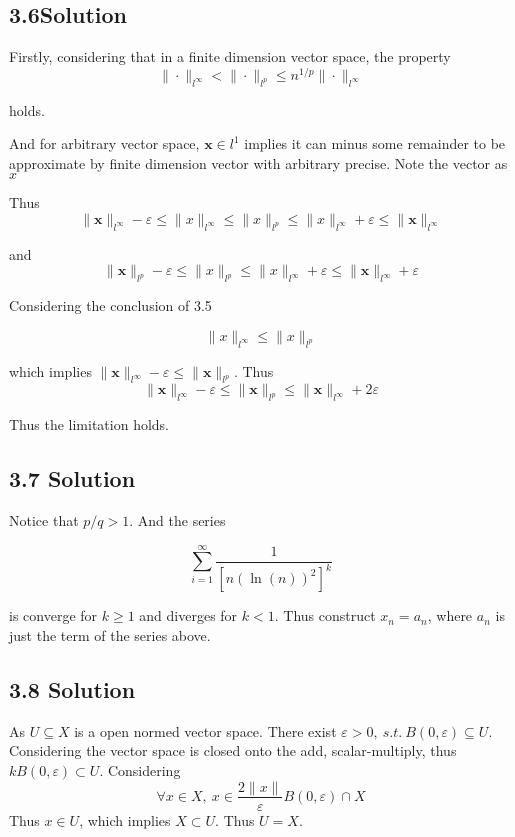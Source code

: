 \documentclass{article}
\begin{document}
\subsection*{3.6Solution}
Firstly, considering that in a finite dimension vector space, the property
\[\|\cdot\|_{l^\infty} < \|\cdot\|_{l^p} \le n^{1/p}\|\cdot\|_{l^\infty}\]

holds.

And for arbitrary vector space, \(\mathbf{x} \in {l}^1\) implies it can minus some remainder to be approximate by finite dimension vector with arbitrary precise. Note the vector as \(x\)

Thus
\[\|\mathbf{x}\|_{l^\infty} - \varepsilon \le \|x\|_{l^\infty} \le \|x\|_{l^p} \le \|x\|_{l^\infty} + \varepsilon \le \|\mathbf x\|_{l^\infty} \]

and 
\[\|\mathbf{x}\|_{l^p} - \varepsilon \le \|x\|_{l^p} \le \|x\|_{l^\infty} + \varepsilon \le \|\mathbf x\|_{l^\infty} + \varepsilon\]

Considering the conclusion of 3.5

\[\|x\|_{l^\infty} \le \|x\|_{l^p}\]

which implies \(\|\mathbf x\|_{l^\infty} - \varepsilon \le \|\mathbf x\|_{l^p}\). Thus 
\[\|\mathbf x\|_{l^\infty} - \varepsilon \le \|\mathbf x\|_{l^p} \le \|\mathbf x\|_{l^\infty} + 2\varepsilon\]

Thus the limitation holds.

\subsection*{3.7 Solution}
Notice that \(p/q > 1\). And the series

\[\sum_{i = 1}^\infty \frac{1}{[n(\ln(n))^2]^k}\]

is converge for \(k \ge 1\) and diverges for \(k < 1\). Thus construct \(x_n = a_n\), where \(a_n\) is just the term of the series above.


\subsection*{3.8 Solution}
As \(U \subseteq X\) is a open normed vector space. There exist \(\varepsilon > 0,\ s.t.\ B(0, \varepsilon) \subseteq U\). Considering the vector space is closed onto the add, scalar-multiply, thus \(k B(0, \varepsilon) \subset U\). Considering
\[\forall x \in X,\ x \in \frac{2\|x\|}{\varepsilon}B(0, \varepsilon) \cap X\]
Thus \(x \in U\), which implies \(X \subset U\). Thus \(U = X\).
\end{document}
